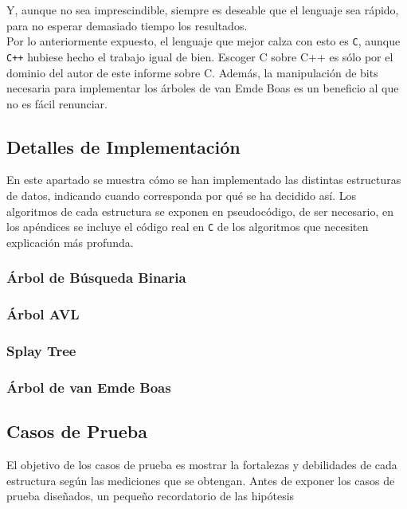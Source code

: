 \documentclass[12pt,letterpaper]{report}
\begin{document}
Y, aunque no sea imprescindible, siempre es deseable que el lenguaje sea rápido, para no esperar demasiado tiempo los resultados.\\

Por lo anteriormente expuesto, el lenguaje que mejor calza con esto es \texttt{C}, aunque \texttt{C++} hubiese hecho el trabajo igual de bien. Escoger C sobre C++ es sólo por el dominio del autor de este informe sobre C. Además, la manipulación de bits necesaria para implementar los árboles de van Emde Boas es un beneficio al que no es fácil renunciar.

\subsection{Detalles de Implementación}
\label{subsec:detalles}
En este apartado se muestra cómo se han implementado las distintas estructuras de datos, indicando cuando corresponda por qué se ha decidido así. Los algoritmos de cada estructura se exponen en pseudocódigo, de ser necesario, en los apéndices se incluye el código real en \texttt{C} de los algoritmos que necesiten explicación más profunda.

\subsubsection{Árbol de Búsqueda Binaria}

\subsubsection{Árbol AVL}

\subsubsection{Splay Tree}

\subsubsection{Árbol de van Emde Boas}


\subsection{Casos de Prueba}
\label{subsec:casos_prueba}
El objetivo de los casos de prueba es mostrar la fortalezas y debilidades de cada estructura según las mediciones que se obtengan. Antes de exponer los casos de prueba diseñados, un pequeño recordatorio de las hipótesis
\end{document}
